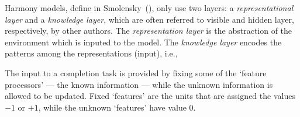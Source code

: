 Harmony models, define in Smolensky~(\citeyear{bib:smolensky1986}), only use two layers: a \emph{representational layer} and a \emph{knowledge layer}, which are often referred to visible and hidden layer, respectively, by other authors. 
The \emph{representation layer} is the abstraction of the environment which is inputed to the model. 
The \emph{knowledge layer} encodes the patterns among the representations (input), i.e., 


The input to a completion task is provided by fixing some of the `feature processors' --- the known information --- while the unknown information is allowed to be updated. Fixed `features' are the units that are assigned the values $-1$ or $+1$, while the unknown `features' have value $0$. 






